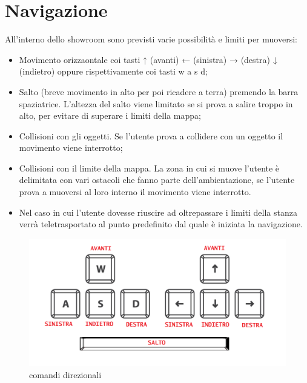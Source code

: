 \section{Navigazione}
All'interno dello showroom sono previsti varie possibilità e limiti per muoversi:
\begin{itemize}
	\item Movimento orizzaontale coi tasti ↑ (avanti) ← (sinistra) → (destra) ↓ (indietro) oppure rispettivamente coi tasti w a s d;
	\item Salto (breve movimento in alto per poi ricadere a terra) premendo la barra spaziatrice. L'altezza del salto viene limitato se si prova a salire troppo in alto, per evitare di superare i limiti della mappa;
	\item Collisioni con gli oggetti. Se l’utente prova a collidere con un oggetto il movimento viene interrotto;
	\item Collisioni con il limite della mappa. La zona in cui si muove l'utente è delimitata con vari ostacoli che fanno parte dell'ambientazione, se l'utente prova a muoversi al loro interno il movimento viene interrotto. 
	\item Nel caso in cui l'utente dovesse riuscire ad oltrepassare i limiti della stanza verrà teletrasportato al punto predefinito dal quale è iniziata la navigazione.
\end{itemize}
\begin{figure}[H]
  \renewcommand{\thefigure}{9}
  \includegraphics[width=\linewidth]{./res/images/comandi_direzionali.png}
  \caption{comandi direzionali}
  \label{comandi direzionali}
\end{figure}
\pagebreak

